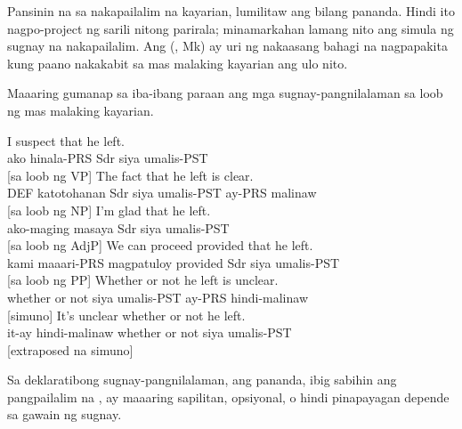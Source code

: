 Pansinin na sa nakapailalim na kayarian, lumilitaw ang  bilang pananda. Hindi ito nagpo-project ng sarili nitong parirala; minamarkahan lamang nito ang simula ng sugnay na nakapailalim. Ang  (, Mk) ay uri ng nakaasang bahagi na nagpapakita kung paano nakakabit sa mas malaking kayarian ang ulo nito.

Maaaring gumanap sa iba-ibang paraan ang mga sugnay-pangnilalaman sa loob ng mas malaking kayarian.

\ea \label{ex:content-funcs-tl}
    \ea \gll I suspect {\ob}that he left{\cb}.\\
        ako hinala-PRS Sdr siya umalis-PST\\
    \glt {} [sa loob ng VP]
    \ex \gll The fact {\ob}that he left{\cb} is clear.\\
        DEF katotohanan Sdr siya umalis-PST ay-PRS malinaw\\
    \glt {} [sa loob ng NP]
    \ex \gll I'm glad {\ob}that he left{\cb}.\\
        ako-maging masaya Sdr siya umalis-PST\\
    \glt {} [sa loob ng AdjP]
    \ex \gll We can proceed provided {\ob}that he left{\cb}.\\
        kami maaari-PRS magpatuloy provided Sdr siya umalis-PST\\
    \glt {} [sa loob ng PP]
    \ex \gll Whether or not he left is unclear.\\
        whether or not siya umalis-PST ay-PRS hindi-malinaw\\
    \glt {} [simuno]
    \ex \gll It's unclear whether or not he left.\\
        it-ay hindi-malinaw whether or not siya umalis-PST\\
    \glt {} [extraposed na simuno]
    \z
\z

Sa deklaratibong sugnay-pangnilalaman, ang pananda, ibig sabihin ang pangpailalim na , ay maaaring sapilitan, opsiyonal, o hindi pinapayagan depende sa gawain ng sugnay.

